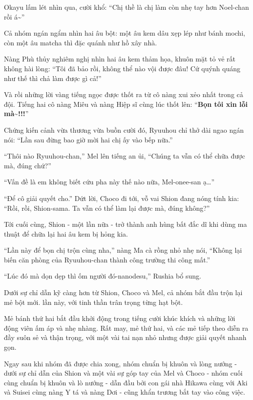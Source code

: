 \documentclass[../main.tex]{subfiles}
\begin{document}
Okayu lấm lét nhìn qua, cười khổ: ``Chị thề là chị làm còn nhẹ tay hơn Noel-chan rồi á\~{}''

\ct

Cả nhóm ngán ngẩm nhìn hai âu bột: một âu kem dâu xẹp lép như bánh mochi, còn một âu matcha thì đặc quánh như hồ xây nhà.

Nàng Phù thủy nghiêm nghị nhìn hai âu kem thảm họa, khuôn mặt tỏ vẻ rất không hài lòng: ``Tôi đã bảo rồi, không thể nào vội được đâu! Cứ quýnh quáng như thế thì chả làm được gì cả!''

Và rồi những lời vàng tiếng ngọc được thốt ra từ cô nàng xui xẻo nhất trong cả đội. Tiếng hai cô nàng Miêu và nàng Hiệp sĩ cùng lúc thốt lên: ``\textbf{Bọn tôi xin lỗi mà\~{}!!!}''

Chứng kiến cảnh vừa thương vừa buồn cười đó, Ryuuhou chỉ thở dài ngao ngán nói: ``Lần sau đừng bao giờ mời hai chị ấy vào bếp nữa.''

``Thôi nào Ryuuhou-chan,'' Mel lên tiếng an ủi, ``Chúng ta vẫn có thể chữa được mà, đúng chứ?''

``Vấn đề là em không biết cứu pha này thế nào nữa, Mel-onee-san ạ\dots''

``Để cô giải quyết cho.'' Dứt lời, Choco đi tới, vỗ vai Shion đang nóng tính kia: ``Rồi, rồi, Shion-sama. Ta vẫn có thể làm lại được mà, đúng không?''

Tới cuối cùng, Shion - một lần nữa - trở thành anh hùng bất đắc dĩ khi dùng ma thuật để chữa lại hai âu kem bị hỏng kia.

``Lần này để bọn chị trộn cùng nha,'' nàng Ma cà rồng nhỏ nhẹ nói, ``Không lại biến căn phòng của Ryuuhou-chan thành công trường thi công mất.''

``Lúc đó mà dọn dẹp thì ốm người đó-nanodesu,'' Rushia bổ sung.

Dưới sự chỉ dẫn kỹ càng hơn từ Shion, Choco và Mel, cả nhóm bắt đầu trộn lại mẻ bột mới. lần này, với tinh thần trân trọng từng hạt bột.

Mẻ bánh thứ hai bắt đầu khởi động trong tiếng cười khúc khích và những lời động viên ấm áp và nhẹ nhàng. Rất may, mẻ thứ hai, và các mẻ tiếp theo diễn ra đầy suôn sẻ và thận trọng, với một vài tai nạn nhỏ nhưng được giải quyết nhanh gọn.

\ct

Ngay sau khi nhóm đã được chia xong, nhóm chuẩn bị khuôn và lòng nướng - dưới sự chỉ dẫn của Shion và một vài sự góp tay của Mel và Choco - nhóm cuối cùng chuẩn bị khuôn và lò nướng - dẫn đầu bởi con gái nhà Hikawa cùng với Aki và Suisei cùng nàng Y tá và nàng Dơi - cũng khẩn trương bắt tay vào công việc.
\end{document}
